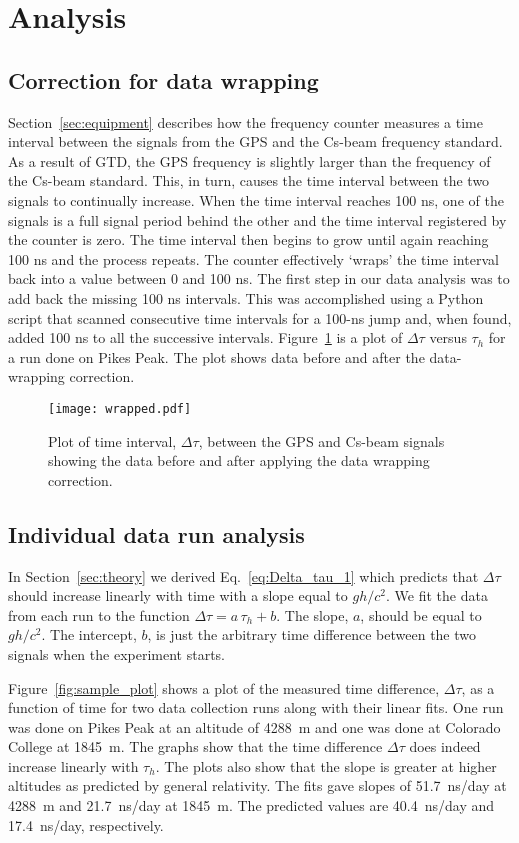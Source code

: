 \documentclass[prb,preprint]{revtex4-1}
\begin{document}
\section{Analysis}

\subsection{Correction for data wrapping} 
Section~\ref{sec:equipment} describes how the frequency counter measures a time interval between the signals from the GPS and the Cs-beam frequency standard. As a result of GTD, the GPS frequency is slightly larger than the frequency of the Cs-beam standard. This, in turn, causes the time interval between the two signals to continually increase. When the time interval reaches 100 ns, one of the signals is a full signal period behind the other and the time interval registered by the counter is zero. The time interval then begins to grow until again reaching 100 ns and the process repeats. The counter effectively `wraps' the time interval back into a value between 0 and 100 ns. The first step in our data analysis was to add back the missing 100 ns intervals. This was accomplished using a Python script that scanned consecutive time intervals for a 100-ns jump and, when found, added 100 ns to all the successive intervals. Figure~\ref{fig:wrapped} is a plot of $\Delta \tau$ versus $\tau_h$ for a run done on Pikes Peak. The plot shows data before and after the data-wrapping correction.
\begin{figure}[ht!] 
\centering
\texttt{[image: wrapped.pdf]}
\caption{Plot of time interval, $\Delta \tau$, between the GPS and Cs-beam signals showing the data before and after applying the data wrapping correction.}
\label{fig:wrapped}
\end{figure}

\subsection{Individual data run analysis}
In Section~\ref{sec:theory} we derived Eq.~\ref{eq:Delta_tau_1} which predicts that $\Delta \tau$ should increase linearly with time with a slope equal to $gh/c^2$. We fit the data from each run to the function $\Delta \tau = a\, \tau_h + b$. The slope, $a$, should be equal to $gh/c^2$. The intercept, $b$, is just the arbitrary time difference between the two signals when the experiment starts.

Figure~\ref{fig:sample_plot} shows a plot of the measured time difference, $\Delta \tau$, as a function of time for two data collection runs along with their linear fits. One run was done on Pikes Peak at an altitude of 4288~m and one was done at Colorado College at 1845~m. The graphs show that the time difference $\Delta \tau$ does indeed increase linearly with $\tau_h$. The plots also show that the slope is greater at higher altitudes as predicted by general relativity. The fits gave slopes of 51.7~ns/day at 4288~m and 21.7~ns/day at 1845~m. The predicted values are 40.4~ns/day and 17.4~ns/day, respectively.
\end{document}
